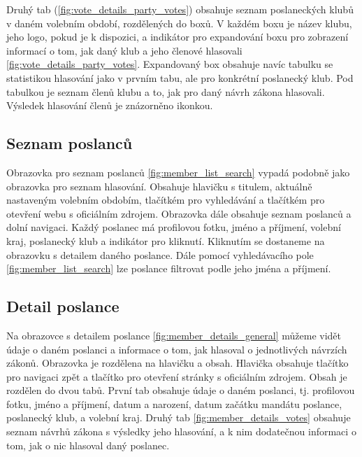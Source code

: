 Druhý tab (\ref{fig:vote_details_party_votes}) obsahuje seznam poslaneckých klubů v daném volebním období, rozdělených do boxů. V každém boxu je název klubu, jeho logo, pokud je k dispozici, a indikátor pro expandování boxu pro zobrazení informací o tom, jak daný klub a jeho členové hlasovali \ref{fig:vote_details_party_votes}. Expandovaný box obsahuje navíc tabulku se statistikou hlasování jako v prvním tabu, ale pro konkrétní poslanecký klub. Pod tabulkou je seznam členů klubu a to, jak pro daný návrh zákona hlasovali. Výsledek hlasování členů je znázorněno ikonkou.

\subsection*{Seznam poslanců}
\label{ssec:design-members}

Obrazovka pro seznam poslanců \ref{fig:member_list_search} vypadá podobně jako obrazovka pro seznam hlasování. Obsahuje hlavičku s titulem, aktuálně nastaveným volebním obdobím, tlačítkém pro vyhledávání a tlačítkém pro otevření webu s oficiálním zdrojem. Obrazovka dále obsahuje seznam poslanců \linebreak a dolní navigaci. Každý poslanec má profilovou fotku, jméno a příjmení, volební kraj, poslanecký klub a indikátor pro kliknutí. Kliknutím se dostaneme na obrazovku s detailem daného poslance. Dále pomocí vyhledávacího pole \ref{fig:member_list_search} lze poslance filtrovat podle jeho jména a příjmení.

\subsection*{Detail poslance}
\label{ssec:design-member}

Na obrazovce s detailem poslance \ref{fig:member_details_general} můžeme vidět údaje o daném poslanci a informace \linebreak o tom, jak hlasoval o jednotlivých návrzích zákonů. Obrazovka je rozdělena na hlavičku a obsah. Hlavička obsahuje tlačítko pro navigaci zpět a tlačítko pro otevření stránky s oficiálním zdrojem. Obsah je rozdělen do dvou tabů. První tab obsahuje údaje o daném poslanci, tj. profilovou fotku, jméno a příjmení, datum a narození, datum začátku mandátu poslance, poslanecký \linebreak klub, a volební kraj. Druhý tab \ref{fig:member_details_votes} obsahuje seznam návrhů zákona s výsledky jeho \linebreak hlasování, a k nim dodatečnou informaci o tom, jak o nic hlasoval daný poslanec. 

